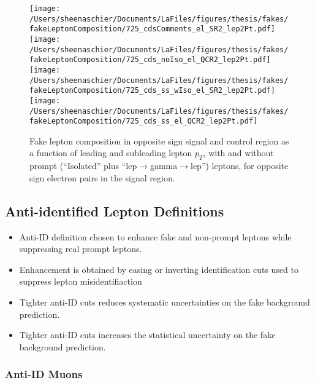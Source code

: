  
\begin{figure}[htb]
        \centering
        \texttt{[image: /Users/sheenaschier/Documents/LaFiles/figures/thesis/fakes/fakeLeptonComposition/725\_cdsComments\_el\_SR2\_lep2Pt.pdf]}
        \texttt{[image: /Users/sheenaschier/Documents/LaFiles/figures/thesis/fakes/fakeLeptonComposition/725\_cds\_noIso\_el\_QCR2\_lep2Pt.pdf]}
        \texttt{[image: /Users/sheenaschier/Documents/LaFiles/figures/thesis/fakes/fakeLeptonComposition/725\_cds\_ss\_wIso\_el\_SR2\_lep2Pt.pdf]}
          \texttt{[image: /Users/sheenaschier/Documents/LaFiles/figures/thesis/fakes/fakeLeptonComposition/725\_cds\_ss\_el\_QCR2\_lep2Pt.pdf]}
        \caption{Fake lepton composition in opposite sign signal and control region as a function of leading and subleading lepton $p_{T}$, with and without prompt (``Isolated'' plus ``lep$\to$gamma$\to$lep'') leptons, for opposite sign electron pairs in the signal region.}
        \label{fig:elMC}
\end{figure}


 \FloatBarrier
 


 \subsection{Anti-identified Lepton Definitions}
 \begin{itemize}
 \item Anti-ID definition chosen to enhance fake and non-prompt leptons while suppressing real prompt leptons.
 \item Enhancement is obtained by easing or inverting identification cuts used to suppress lepton misidentifiaction
 \item Tighter anti-ID cuts reduces systematic uncertainties on the fake background prediction.
 \item Tighter anti-ID cuts increases the statistical uncertainty on the fake background prediction.
 \end{itemize}

\subsubsection{Anti-ID Muons}


